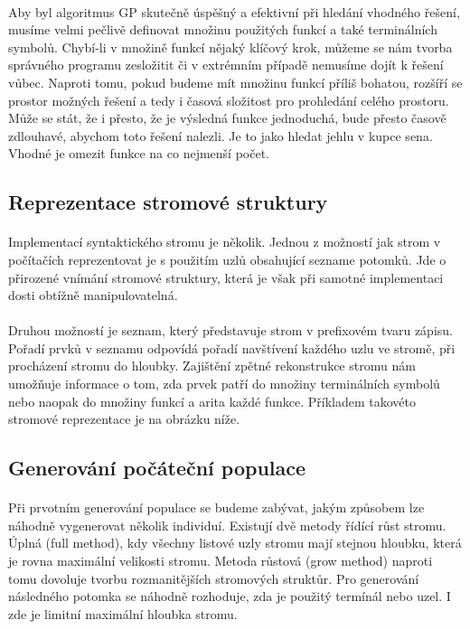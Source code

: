 \documentclass[bc,male,java,dept460]{diploma}		%
\begin{document}
\paragraph*{}
Aby byl algoritmus GP skutečně úspěšný a efektivní při hledání vhodného řešení, musíme velmi pečlivě definovat množinu použitých funkcí a také terminálních symbolů. Chybí-li v množině funkcí nějaký klíčový krok, můžeme se nám tvorba správného programu zesložitit či v extrémním případě nemusíme dojít k řešení vůbec. Naproti tomu, pokud budeme mít množinu funkcí příliš bohatou, rozšíří se prostor možných řešení a tedy i časová složitost pro prohledání celého prostoru. Může se stát, že i přesto, že je výsledná funkce jednoduchá, bude přesto časově zdlouhavé, abychom toto řešení nalezli. Je to jako hledat jehlu v kupce sena. Vhodné je omezit funkce na co nejmenší počet.

\subsection{Reprezentace stromové struktury}
\paragraph*{}
Implementací syntaktického stromu je několik. Jednou z možností jak strom v počítačích reprezentovat je s použitím uzlů obsahující sezname potomků. Jde o přirozené vnímání stromové struktury, která je však při samotné implementaci dosti obtížně manipulovatelná. 

\paragraph*{}
Druhou možností je seznam, který představuje strom v prefixovém tvaru zápisu. Pořadí prvků v seznamu odpovídá pořadí navštívení každého uzlu ve stromě, při procházení stromu do hloubky. Zajištění zpětné rekonstrukce stromu nám umožňuje informace o tom, zda prvek patří do množiny terminálních symbolů nebo naopak do množiny funkcí a arita každé funkce. Příkladem takovéto stromové reprezentace je na obrázku níže.


\subsection{Generování počáteční populace}
\paragraph*{}
Při prvotním generování populace se budeme zabývat, jakým způsobem lze náhodně vygenerovat několik individuí. Existují dvě metody řídící růst stromu. Úplná (full method), kdy všechny listové uzly stromu mají stejnou hloubku, která je rovna maximální velikosti stromu. Metoda růstová (grow method) naproti tomu dovoluje tvorbu rozmanitějších stromových struktůr. Pro generování následného potomka se náhodně rozhoduje, zda je použitý termínál nebo uzel. I zde je limitní maximální hloubka stromu.
\end{document}
